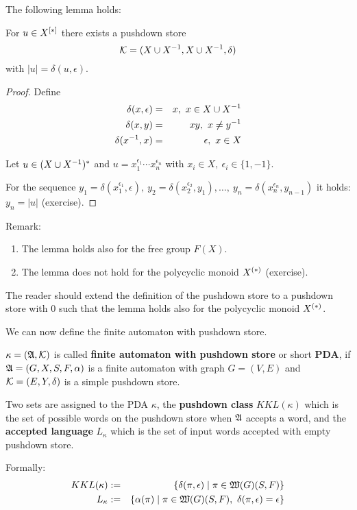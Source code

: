 The following lemma holds:
\begin{lemma}
For $u \in \mbox{${X}^{[*]}$}$ there exists a pushdown store
\[ \mbox{$\mathcal{K}$} =(X \cup {X}^{-1}, X \cup {X}^{-1}, \delta) \]
with $|u| = \delta(u, \epsilon)$.
\end{lemma}

\begin{proof}
Define
\begin{eqnarray*}
\delta(x, \epsilon) & = & x,\ x\in X \cup {X}^{-1}\\
\delta(x, y) & = & x y,\ x\neq y^{-1}\\
\delta(x^{-1}, x) & = & \epsilon,\ x\in X
\end{eqnarray*}

Let $u\in (X \cup {X}^{-1})^*$ and $u = x_1^{\epsilon_1} \cdots x_n^{\epsilon_n}$
with $x_i\in X,\ \epsilon_i\in \{1, -1\}$.

For the sequence $y_1 = \delta(x_1^{\epsilon_1}, \epsilon),\ y_2 =
\delta(x_2^{\epsilon_2}, y_1), \ldots,\ y_n = \delta(x_n^{\epsilon_n}, y_{n-1})$
it holds: $y_n = |u|$ (exercise).
\end{proof}

Remark:
\begin{enumerate}
  \item The lemma holds also for the free group $F(X)$.
  \item The lemma does not hold for the polycyclic monoid $\mbox{${X}^{(*)}$}$
  (exercise).
\end{enumerate}

The reader should extend the definition of the pushdown store to a
pushdown store with 0 such that the lemma holds also for the polycyclic monoid
$\mbox{${X}^{(*)}$}$.

We can now define the finite automaton with pushdown store.

\begin{definition}
$\kappa = (\mbox{$\mathfrak{A}$}, \mbox{$\mathcal{K}$})$ is called {\bf finite automaton with
pushdown store} or short {\bf PDA}, if $\mbox{$\mathfrak{A}$} = (G, X, S, F, \alpha)$ is a
finite automaton with graph $G = (V, E)$ and $\mbox{$\mathcal{K}$} = (E, Y,\delta)$ is a
simple pushdown store.
\end{definition}

Two sets are assigned to the PDA $\kappa$, the {\bf pushdown class}
$KKL(\kappa)$ which is the set of possible words on the pushdown store when
$\mbox{$\mathfrak{A}$}$ accepts a word, and the {\bf accepted language} $L_\kappa$ which is the
set of input words accepted with empty pushdown store.

Formally:
\begin{eqnarray*}
KKL(\kappa) &:=& \{ \delta(\pi, \epsilon) \mid \pi \in \mbox{$\mathfrak{W}(G)$}(S, F) \} \\
L_\kappa &:=& \{ \alpha(\pi) \mid \pi \in \mbox{$\mathfrak{W}(G)$}(S, F),\ \delta(\pi,
\epsilon) = \epsilon \}
\end{eqnarray*}

